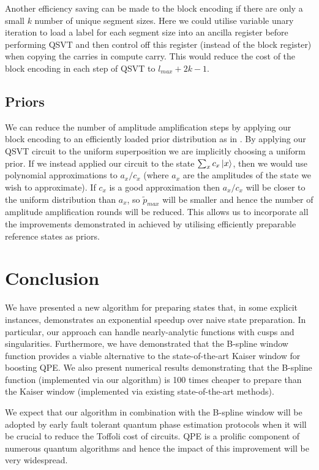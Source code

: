 \documentclass[aps,prx,twocolumn,floatfix,10pt,amssymb,amsfont,amsmath,superscriptaddress,float,nofootinbib,longbibliography,nobalancelastpage]{revtex4-2}
\theoremstyle{empty}
\begin{document}
Another efficiency saving can be made to the block encoding if there are only a small $k$ number of unique segment sizes. Here we could utilise variable unary iteration to load a label for each segment size into an ancilla register before performing QSVT and then control off this register (instead of the block register) when copying the carries in compute carry. This would reduce the cost of the block encoding in each step of QSVT to $l_{max} + 2 k - 1$.

\subsection{Priors} We can reduce the number of amplitude amplification steps by applying our block encoding to an efficiently loaded prior distribution as in \cite{Lemieux:2024pmt, Babbush_2019}. By applying our QSVT circuit to the uniform superposition we are implicitly choosing a uniform prior. If we instead applied our circuit to the state $\sum_x c_x \ket{x}$, then we would use polynomial approximations to $a_x/c_x$ (where $a_x$ are the amplitudes of the state we wish to approximate). If $c_x$ is a good approximation then $a_x/c_x$ will be closer to the uniform distribution than $a_x$, so $\tilde{p}_{max}$ will be smaller and hence the number of amplitude amplification rounds will be reduced. This allows us to incorporate all the improvements demonstrated in \cite{Lemieux:2024pmt} achieved by utilising efficiently preparable reference states as priors.

\section{Conclusion}
We have presented a new algorithm for preparing states that, in some explicit instances, demonstrates an exponential speedup over naive state preparation. In particular, our approach can handle nearly-analytic functions with cusps and singularities. Furthermore, we have demonstrated that the B-spline window function provides a viable alternative to the state-of-the-art Kaiser window for boosting QPE. We also present numerical results demonstrating that the B-spline function (implemented via our algorithm) is 100 times cheaper to prepare than the Kaiser window (implemented via existing state-of-the-art methods).

We expect that our algorithm in combination with the B-spline window will be adopted by early fault tolerant quantum phase estimation protocols when it will be crucial to reduce the Toffoli cost of circuits. QPE is a prolific component of numerous quantum algorithms and hence the impact of this improvement will be very widespread.
\end{document}
